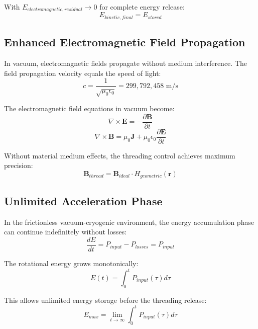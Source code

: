 \documentclass[12pt,a4paper]{article}
\begin{document}
With $E_{electromagnetic,residual} \rightarrow 0$ for complete energy release:
\begin{equation}
E_{kinetic,final} = E_{stored}
\end{equation}

\subsection{Enhanced Electromagnetic Field Propagation}

In vacuum, electromagnetic fields propagate without medium interference. The field propagation velocity equals the speed of light:
\begin{equation}
c = \frac{1}{\sqrt{\mu_0 \epsilon_0}} = 299,792,458 \text{ m/s}
\end{equation}

The electromagnetic field equations in vacuum become:
\begin{equation}
\nabla \times \mathbf{E} = -\frac{\partial \mathbf{B}}{\partial t}
\end{equation}
\begin{equation}
\nabla \times \mathbf{B} = \mu_0 \mathbf{J} + \mu_0 \epsilon_0 \frac{\partial \mathbf{E}}{\partial t}
\end{equation}

Without material medium effects, the threading control achieves maximum precision:
\begin{equation}
\mathbf{B}_{thread} = \mathbf{B}_{ideal} \cdot H_{geometric}(\mathbf{r})
\end{equation}

\subsection{Unlimited Acceleration Phase}

In the frictionless vacuum-cryogenic environment, the energy accumulation phase can continue indefinitely without losses:
\begin{equation}
\frac{dE}{dt} = P_{input} - P_{losses} = P_{input}
\end{equation}

The rotational energy grows monotonically:
\begin{equation}
E(t) = \int_0^t P_{input}(\tau) d\tau
\end{equation}

This allows unlimited energy storage before the threading release:
\begin{equation}
E_{max} = \lim_{t \rightarrow \infty} \int_0^t P_{input}(\tau) d\tau
\end{equation}
\end{document}
